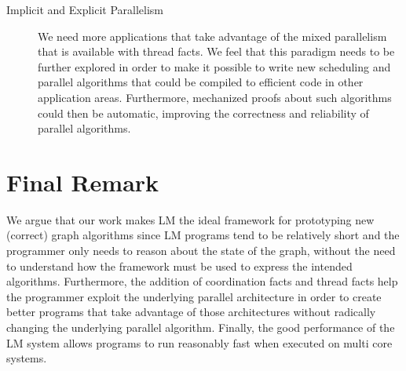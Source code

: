 \begin{description}
\item[Implicit and Explicit Parallelism] We need more applications that take
   advantage of the mixed parallelism that is available with thread facts. We
   feel that this paradigm needs to be further explored in order to make it
   possible to write new scheduling and parallel algorithms that could be
   compiled to efficient code in other application areas. Furthermore,
   mechanized proofs about such algorithms could then be automatic, improving
   the correctness and reliability of parallel algorithms.

\end{description}

\section{Final Remark}

We argue that our work makes LM the ideal framework for prototyping new
(correct) graph algorithms since LM programs tend to be relatively short and the
programmer only needs to reason about the state of the graph, without the need
to understand how the framework must be used to express the intended algorithms.
Furthermore, the addition of coordination facts and thread facts help the
programmer exploit the underlying parallel architecture in order to create
better programs that take advantage of those architectures without radically
changing the underlying parallel algorithm.  Finally, the good performance of
the LM system allows programs to run reasonably fast when executed on multi core
systems.

